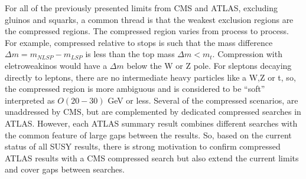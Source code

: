 

For all of the previously presented limits from CMS and ATLAS, excluding gluinos and squarks, a common thread is that the weakest exclusion regions are the compressed regions. The compressed region varies from process to process. For example, compressed relative to stops is such that the mass difference $\Delta m = m_{NLSP} - m_{LSP}$ is less than the top mass $\Delta m < m_t$. Compression with eletroweakinos would have a $\Delta m$  below the W or Z pole. For sleptons decaying directly to leptons, there are no intermediate heavy particles like a W,Z or t, so, the compressed region is more ambiguous and is considered to be ``soft'' interpreted as $O(20-30)$ GeV or less. Several of the compressed scenarios, are unaddressed by CMS, but are complemented by dedicated compressed searches in ATLAS. However, each ATLAS summary result combines different searches with the common feature of large gaps between the results. So, based on the current status of all SUSY results, there is strong motivation to confirm compressed ATLAS results with a CMS compressed search but also extend the current limits and cover gaps between searches.

